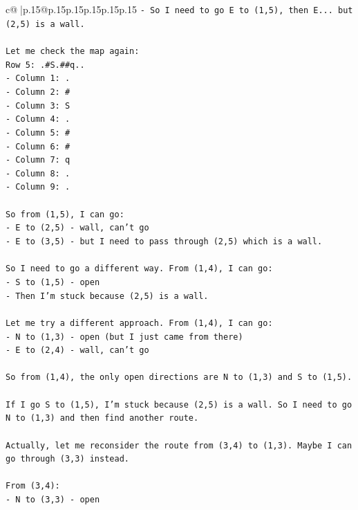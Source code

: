\documentclass{article}
\begin{document}
{\begin{supertabular}{c@{$\;$}|p{.15\linewidth}@{}p{.15\linewidth}p{.15\linewidth}p{.15\linewidth}p{.15\linewidth}p{.15\linewidth}}
{{{\texttt{{-} So I need to go E to (1,5), then E... but (2,5) is a wall.} \\
\\ 
\texttt{Let me check the map again:} \\
\texttt{Row 5: .\#S.\#\#q..} \\
\texttt{{-} Column 1: .} \\
\texttt{{-} Column 2: \#} \\
\texttt{{-} Column 3: S} \\
\texttt{{-} Column 4: .} \\
\texttt{{-} Column 5: \#} \\
\texttt{{-} Column 6: \#} \\
\texttt{{-} Column 7: q} \\
\texttt{{-} Column 8: .} \\
\texttt{{-} Column 9: .} \\
\\ 
\texttt{So from (1,5), I can go:} \\
\texttt{{-} E to (2,5) {-} wall, can't go} \\
\texttt{{-} E to (3,5) {-} but I need to pass through (2,5) which is a wall.} \\
\\ 
\texttt{So I need to go a different way. From (1,4), I can go:} \\
\texttt{{-} S to (1,5) {-} open} \\
\texttt{{-} Then I'm stuck because (2,5) is a wall.} \\
\\ 
\texttt{Let me try a different approach. From (1,4), I can go:} \\
\texttt{{-} N to (1,3) {-} open (but I just came from there)} \\
\texttt{{-} E to (2,4) {-} wall, can't go} \\
\\ 
\texttt{So from (1,4), the only open directions are N to (1,3) and S to (1,5).} \\
\\ 
\texttt{If I go S to (1,5), I'm stuck because (2,5) is a wall. So I need to go N to (1,3) and then find another route.} \\
\\ 
\texttt{Actually, let me reconsider the route from (3,4) to (1,3). Maybe I can go through (3,3) instead.} \\
\\ 
\texttt{From (3,4):} \\
\texttt{{-} N to (3,3) {-} open} \\
}}}
\end{supertabular}}
\end{document}
